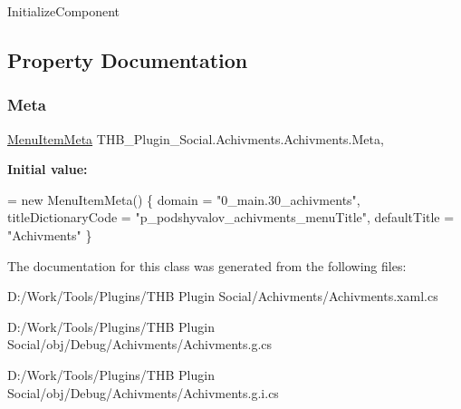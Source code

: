 Initialize\+Component 



\subsection{Property Documentation}
\mbox{\label{class_t_h_b___plugin___social_1_1_achivments_1_1_achivments_abd3121deb1475dcaa00041ac8b1a5ba4}} 
\subsubsection{\texorpdfstring{Meta}{Meta}}
{\footnotesize\ttfamily \mbox{\hyperlink{class_uniform_client_1_1_plugins_1_1_menu_item_meta}{Menu\+Item\+Meta}} T\+H\+B\+\_\+\+Plugin\+\_\+\+Social.\+Achivments.\+Achivments.\+Meta\hspace{0.3cm}{\ttfamily [get]}, {\ttfamily [set]}}

{\bfseries Initial value\+:}
\begin{DoxyCode}
= \textcolor{keyword}{new} MenuItemMeta()
        \{
            domain = \textcolor{stringliteral}{"0\_main.30\_achivments"},
            titleDictionaryCode = \textcolor{stringliteral}{"p\_podshyvalov\_achivments\_menuTitle"},
            defaultTitle = \textcolor{stringliteral}{"Achivments"}
        \}
\end{DoxyCode}


The documentation for this class was generated from the following files\+:\begin{DoxyCompactItemize}
\item 
D\+:/\+Work/\+Tools/\+Plugins/\+T\+H\+B Plugin Social/\+Achivments/Achivments.\+xaml.\+cs\item 
D\+:/\+Work/\+Tools/\+Plugins/\+T\+H\+B Plugin Social/obj/\+Debug/\+Achivments/Achivments.\+g.\+cs\item 
D\+:/\+Work/\+Tools/\+Plugins/\+T\+H\+B Plugin Social/obj/\+Debug/\+Achivments/Achivments.\+g.\+i.\+cs\end{DoxyCompactItemize}
